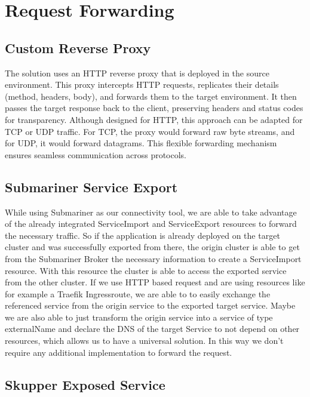 %
\section{Request Forwarding}
\label{sec:request_forwarding}
%
\subsection{Custom Reverse Proxy}
%
The solution uses an HTTP reverse proxy that is deployed in the source environment. This proxy intercepts HTTP requests, replicates their details (method, headers, body), and forwards them to the target environment. It then passes the target response back to the client, preserving headers and status codes for transparency.
Although designed for HTTP, this approach can be adapted for TCP or UDP traffic. For TCP, the proxy would forward raw byte streams, and for UDP, it would forward datagrams. This flexible forwarding mechanism ensures seamless communication across protocols.
%
\subsection{Submariner Service Export}
%
While using Submariner as our connectivity tool, we are able to take advantage of the already integrated ServiceImport and ServiceExport resources to forward the necessary traffic. 
So if the application is already deployed on the target cluster and was successfully exported from there, the origin cluster is able to get from the Submariner Broker the necessary information to create a ServiceImport resource.
With this resource the cluster is able to access the exported service from the other cluster.
If we use HTTP based request and are using resources like for example a Traefik Ingressroute, we are able to to easily exchange the referenced service from the origin service to the exported target service. 
Maybe we are also able to just transform the origin service into a service of type externalName and declare the DNS of the target Service to not depend on other resources, which allows us to have a universal solution.
In this way we don't require any additional implementation to forward the request.
%
\subsection{Skupper Exposed Service}
%
